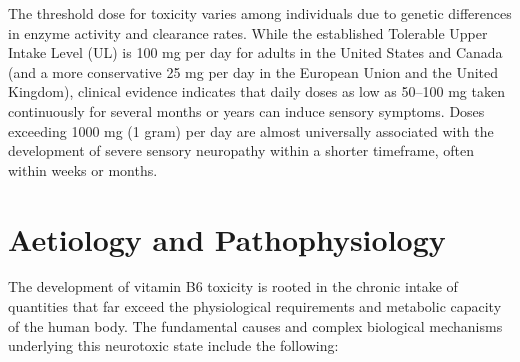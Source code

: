 The threshold dose for toxicity varies among individuals due to genetic differences in enzyme activity and clearance rates. While the established Tolerable Upper Intake Level (UL) is 100 mg per day for adults in the United States and Canada (and a more conservative 25 mg per day in the European Union and the United Kingdom), clinical evidence indicates that daily doses as low as 50--100 mg taken continuously for several months or years can induce sensory symptoms. Doses exceeding 1000 mg (1 gram) per day are almost universally associated with the development of severe sensory neuropathy within a shorter timeframe, often within weeks or months.

\section*{Aetiology and Pathophysiology}
The development of vitamin B6 toxicity is rooted in the chronic intake of quantities that far exceed the physiological requirements and metabolic capacity of the human body. The fundamental causes and complex biological mechanisms underlying this neurotoxic state include the following:


